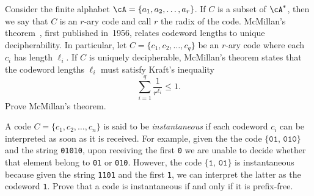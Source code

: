 \begin{problem}
\item Consider the finite alphabet
  $\cA = \{a_1, a_2, \dots, a_r\}$. If $C$ is a subset of $\cA^\ast$,
  then we say that $C$ is an $r$-ary code and call
  $r$ the radix of the code.
  McMillan's
  theorem~\cite{McMillan1956}, first published
  in~1956, relates codeword lengths to unique decipherability. In
  particular, let $C = \{c_1, c_2, \dots, c_q\}$ be an $r$-ary code
  where each $c_i$ has length $\ell_i$. If $C$ is uniquely
  decipherable, McMillan's theorem states that the codeword lengths
  $\ell_i$ must satisfy Kraft's inequality
  \[
  \sum_{i=1}^q \frac{1}{r^{\ell_i}}
  \leq
  1.
  \]
  Prove McMillan's theorem.

\item A code $C = \{c_1, c_2, \dots, c_n\}$ is said to be
  \emph{instantaneous} if each codeword $c_i$ can be interpreted as
  soon as it is received. For example, given the the code
  $\{\texttt{01},\, \texttt{010}\}$ and the string \texttt{01010},
  upon receiving the first \texttt{0} we are unable to decide whether
  that element belong to \texttt{01} or \texttt{010}. However, the
  code $\{\texttt{1},\, \texttt{01}\}$ is instantaneous because given
  the string \texttt{1101} and the first \texttt{1}, we can interpret
  the latter as the codeword \texttt{1}.  Prove that a code is
  instantaneous if and only if it is prefix-free.
\end{problem}
